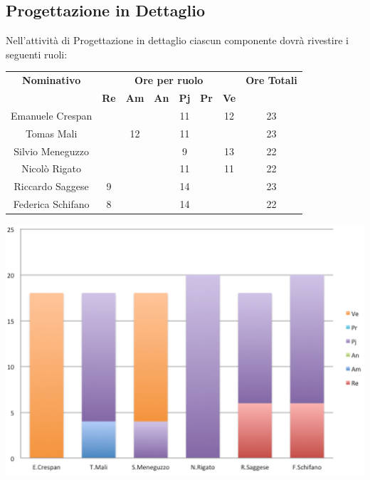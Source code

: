 \subsection{Progettazione in Dettaglio}
Nell’attività di Progettazione in dettaglio ciascun componente dovrà rivestire i seguenti ruoli:
\begin{center}
  \centering
  \begin{tabular} {|c|c|c|c|c|c|c|c|}
    \hline
    \textbf{Nominativo} & \multicolumn{6}{|c|}{\textbf{Ore per ruolo}} & \textbf{Ore Totali} \\
    & \textbf{Re} & \textbf{Am} & \textbf{An} & \textbf{Pj} & \textbf{Pr} & \textbf{Ve} & \\
    \hline
    Emanuele Crespan & & & &11 & &12 &23\\
    \hline
    Tomas Mali & &12 & &11 & & &23\\
    \hline
    Silvio Meneguzzo & & & &9 & &13 &22\\
    \hline
    Nicolò Rigato & & & &11 & &11 &22\\
    \hline
    Riccardo Saggese &9 & & &14 & & &23\\
    \hline
    Federica Schifano &8 & & &14 & & &22\\
    \hline
  \end{tabular}
  \includegraphics[scale=0.65]{img/fig4.png}
\end{center}

